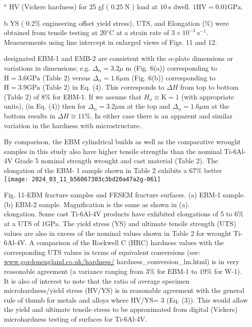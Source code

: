 \documentclass[10pt]{article}
\begin{document}
${ }^{a}$ HV (Vickers hardness) for 25 gf ( $0.25 \mathrm{~N}$ ) load at $10 \mathrm{~s}$ dwell. $1 \mathrm{HV}=0.01 \mathrm{GPa}$.

b YS ( $0.2 \%$ engineering offset yield stress), UTS, and Elongation (\%) were obtained from tensile testing at $20^{\circ} \mathrm{C}$ at a strain rate of $3 \times 10^{-3} \mathrm{~s}^{-1}$. Measurements using line intercept in enlarged views of Figs. 11 and 12.

designated EBM-1 and EMB-2 are consistent with the $\alpha$-plate dimensions or variations in dimensions; e.g. $\Delta_{\alpha}=3.2 \mu$ m (Fig. 6(a)) corresponding to $\mathrm{H}=3.6 \mathrm{GPa}$ (Table 2) versus $\Delta_{\alpha}=1.6 \mu \mathrm{m}$ (Fig. 6(b)) corresponding to $\mathrm{H}=3.9 \mathrm{GPa}$ (Table 2) in Eq. (4). This corresponds to $\Delta H$ from top to bottom (Table 2) of $8 \%$ for EBM-1. If we assume that $H_{\mathrm{o}} \equiv \mathrm{K}=1$ (with appropriate units), (in Eq. (4)) then for $\Delta_{\alpha}=3.2 \mu \mathrm{m}$ at the top and $\Delta_{\alpha}=1.6 \mu \mathrm{m}$ at the bottom results in $\Delta H \cong 11 \%$. In either case there is an apparent and similar variation in the hardness with microstructure.

By comparison, the EBM cylindrical builds as well as the comparative wrought samples in this study also have higher tensile strengths than the nominal Ti-6Al-4V Grade 5 nominal strength wrought and cast material (Table 2). The elongation of the EBM- 1 sample shown in Table 2 exhibits a $67 \%$ better\\
\texttt{[image: 2024\_03\_11\_b56067303c3bd20a47a2g-061]}

Fig. 11-EBM fracture samples and FESEM fracture surfaces. (a) EBM-1 sample. (b) EBM-2 sample. Magnification is the same as shown in (a).\\
elongation. Some cast Ti-6Al-4V products have exhibited elongations of 5 to $6 \%$ at a UTS of $1 \mathrm{GPa}$. The yield stress (YS) and ultimate tensile strength (UTS) values are also in excess of the nominal values shown in Table 2 for wrought Ti-6Al-4V. A comparison of the Rockwell C (HRC) hardness values with the corresponding UTS values in terms of equivalent conversions (see: \href{http://www.gordonengland.co.uk/hardness/}{www.gordonengland.co.uk/hardness/} hardness\_conversion\_lm.html) is in very reasonable agreement (a variance ranging from $3 \%$ for EBM-1 to $19 \%$ for W-1). It is also of interest to note that the ratio of average specimen microhardness/yield stress (HV/YS) is in reasonable agreement with the general rule of thumb for metals and alloys where HV/YS= 3 (Eq. (3)). This would allow the yield and ultimate tensile stress to be approximated from digital (Vickers) microhardness testing of surfaces for Ti-6Al-4V.
\end{document}
